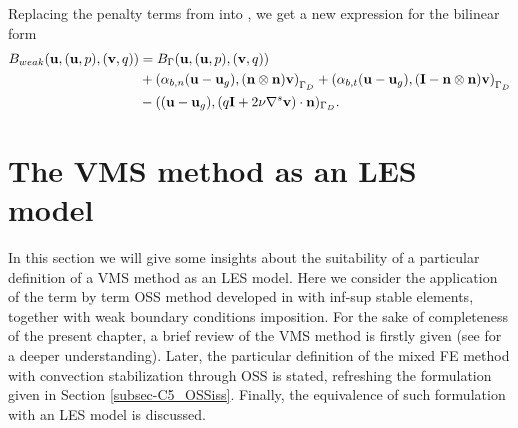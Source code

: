 Replacing the penalty terms from  into , we get a new expression for the bilinear form
\begin{align}
\label{eq-C7_bilinear_weak_by_components}
B_{weak}({\bf u},({\bf u},p),({\bf v},q))&=B_\Gamma({\bf u},({\bf u},p),({\bf v},q))\\\nonumber
&+\left(\alpha_{b,n}({\bf u}-{\bf u}_g),({\bf n}\otimes{\bf n}){\bf v}\right)_{\Gamma_D}+\left(\alpha_{b,t}({\bf u}-{\bf u}_g),(\mathbf{I}-{\bf n}\otimes{\bf n}){\bf v}\right)_{\Gamma_D}\\\nonumber
&-(({\bf u}-{\bf u}_g),(q\mathbf{I}+2\nu\nabla^s{\bf v})\cdot{\bf n})_{\Gamma_D}.
\end{align}

\section{The VMS method as an LES model}
\label{sec-C7_VMS}
In this section we will give some insights about the suitability of a particular definition of a VMS method as an LES model. Here we consider the application of the term by term OSS method developed in  with inf-sup stable elements, together with weak boundary conditions imposition. For the sake of completeness of the present chapter, a brief review of the VMS method is firstly given (see  for a deeper understanding). Later, the particular definition of the mixed FE method with convection stabilization through OSS is stated, refreshing the formulation given in Section \ref{subsec-C5_OSSiss}. Finally, the equivalence of such formulation with an LES model is discussed.

